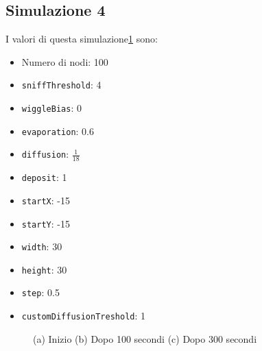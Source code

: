 \subsection{Simulazione 4}\label{sim4}
I valori di questa simulazione\space \cref{fig:sim4} sono:
\begin{itemize}
    \item Numero di nodi: 100
    \item \texttt{sniffThreshold}: 4
    \item \texttt{wiggleBias}: 0
    \item \texttt{evaporation}: 0.6
    \item \texttt{diffusion}: $\frac{1}{18}$
    \item \texttt{deposit}: 1
    \item \texttt{startX}: -15
    \item \texttt{startY}: -15
    \item \texttt{width}: 30
    \item \texttt{height}: 30
    \item \texttt{step}: 0.5
    \item \texttt{customDiffusionTreshold}: 1
\end{itemize}
\begin{figure}[p]
    \centering
    \caption{(a) Inizio (b) Dopo 100 secondi (c) Dopo 300 secondi}\label{fig:sim4}
\end{figure}

